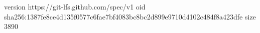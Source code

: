 version https://git-lfs.github.com/spec/v1
oid sha256:1387fe8ce4d135f0577c6fae7bf4083bc8bc2d899e9710d4102c484f8a423dfe
size 3890
